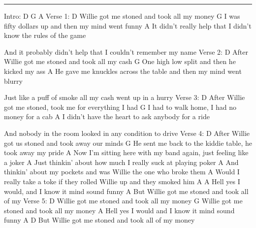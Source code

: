 \noindent\rule{\columnwidth}{1pt}

\begin{lstsong}
Intro:  D  G  A    Verse 1:
D
Willie got me stoned and took all my money
      G
I was fifty dollars up and then my mind went funny
   A
It didn't really help that I didn't know the rules of the game
 
And it probably didn't help that I couldn't remember my name
Verse 2:  D
After Willie got me stoned and took all my cash
    G
One high low split and then he kicked my ass
           A
He gave me knuckles across the table and then my mind went blurry
 
Just like a puff of smoke all my cash went up in a hurry
Verse 3:   D
After Willie got me stoned, took me for everything I had
  G
I had to walk home, I had no money for a cab
  A
I didn't have the heart to ask anybody for a ride
 
And nobody in the room looked in any condition to drive
Verse 4:  D
After Willie got us stoned and took away our minds
           G
He sent me back to the kiddie table, he took away my pride
        A
Now I'm sitting here with my band again, just feeling like a joker
     A
Just thinkin' about how much I really suck at playing poker
    A
And thinkin' about my pockets and was Willie the one who broke them
        A
Would I really take a toke if they rolled Willie up and they smoked him
     A                  A
Hell yes I would, and I know it mind sound funny
    A
But Willie got me stoned and took all of my
Verse 5: D
Willie got me stoned and took all my money
G
Willie got me stoned and took all my money
     A
Hell yes I would and I know it mind sound funny
    A                                         D
But Willie got me stoned and took all of my money
\end{lstsong}
\newpage

